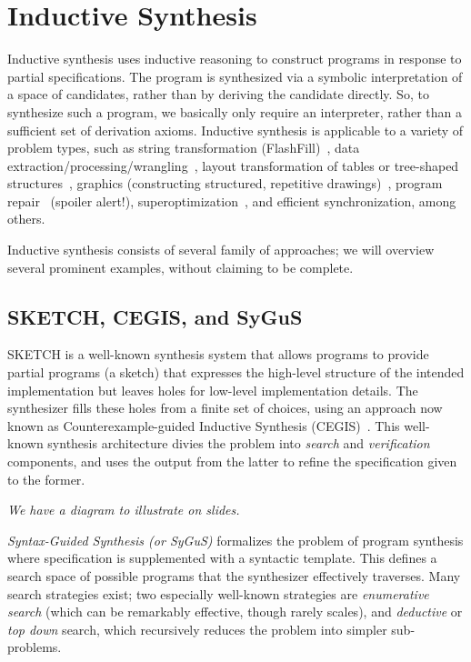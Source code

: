 \documentclass[11pt]{article}
\begin{document}
\section{Inductive Synthesis} 

Inductive synthesis uses inductive reasoning to construct programs in response
to partial specifications. The program is synthesized via a symbolic
interpretation of a space of candidates, rather than by deriving the candidate
directly. So, to synthesize such a program, we basically only require an
interpreter, rather than a sufficient set of derivation axioms. Inductive
synthesis is applicable to a variety of problem types, such as string
transformation (FlashFill)~\cite{Gulwani2012}, data
extraction/processing/wrangling~\cite{Gulwani2016,Singh2016}, layout
transformation of tables or tree-shaped structures~\cite{Yaghmazadeh2016},
graphics (constructing structured, repetitive
drawings)~\cite{Hempel2016,Chugh2016}, program
repair~\cite{mechtaev2016angelix,genprog-tse-journal} (spoiler alert!),
superoptimization~\cite{Joshi2002}, and efficient synchronization, among others.

Inductive synthesis consists of several family of approaches; we will overview
several prominent examples, without claiming to be complete.  

\subsection{SKETCH, CEGIS, and SyGuS}

SKETCH is a well-known synthesis system that allows programs to provide partial
programs (a sketch) that expresses the high-level structure of the intended
implementation but leaves holes for low-level implementation details. The
synthesizer fills these holes from a finite set of choices, using an approach
now known as Counterexample-guided Inductive Synthesis
(CEGIS)~\cite{sketch,Polozov2015}. This well-known synthesis architecture divies
the problem into \emph{search} and \emph{verification} components, and uses the
output from the latter to refine the specification given to the former.

\vspace{1em}
\noindent\emph{We have a diagram to illustrate on slides.}
\vspace{1em}

\emph{Syntax-Guided Synthesis (or SyGuS)} formalizes the problem of
program synthesis where specification is supplemented with a syntactic
template.  This defines a search space of possible programs that the synthesizer
effectively traverses.  Many search strategies exist; two especially well-known
strategies are \emph{enumerative search} (which can be remarkably effective,
though rarely scales), and \emph{deductive} or \emph{top down} search, which
recursively reduces the problem into simpler sub-problems.  
\end{document}

